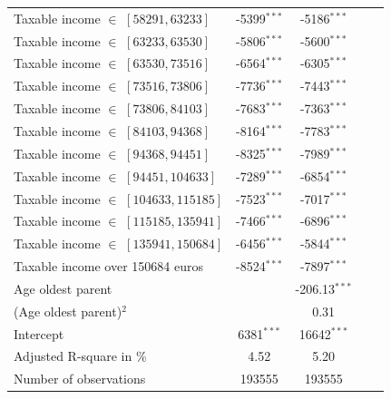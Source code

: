{\begin{table}[H]
{\begin{tabular}{lcccc}
Taxable income $\in$ $[58291,63233]$             &   -5399$^{***}$                &-5186$^{***}$      \\
Taxable income $\in$ $[63233,63530]$             &   -5806$^{***}$                &-5600$^{***}$      \\
Taxable income $\in$ $[63530,73516]$             &   -6564$^{***}$                &-6305$^{***}$      \\
Taxable income $\in$ $[73516,73806]$             &   -7736$^{***}$                &-7443$^{***}$      \\
Taxable income $\in$ $[73806,84103]$             &   -7683$^{***}$                &-7363$^{***}$      \\
Taxable income $\in$ $[84103,94368]$             &   -8164$^{***}$                &-7783$^{***}$      \\
Taxable income $\in$ $[94368,94451]$             &   -8325$^{***}$                &-7989$^{***}$      \\
Taxable income $\in$ $[94451,104633]$            &   -7289$^{***}$                &-6854$^{***}$      \\
Taxable income $\in$ $[104633,115185]$           &   -7523$^{***}$                &-7017$^{***}$      \\
Taxable income $\in$ $[115185,135941]$           &   -7466$^{***}$                &-6896$^{***}$      \\
Taxable income $\in$ $[135941,150684]$           &   -6456$^{***}$                &-5844$^{***}$      \\
Taxable income over 150684 euros                 &   -8524$^{***}$                &-7897$^{***}$      \\
\midrule 
Age oldest parent                                &                                   & -206.13$^{***}$\\
(Age oldest parent)$^2$                          &                                   & 0.31           \\                         

\midrule
Intercept                                  &   6381$^{***}$ & 16642$^{***}$&                          \\
\hdrule
\bottomrule
Adjusted R-square in \%  &    4.52     & 5.20                                                         \\
\bottomrule
Number of observations  &    193555     & 193555                                                      \\
\bottomrule
\end{tabular}
}
\end{table}
  } 



